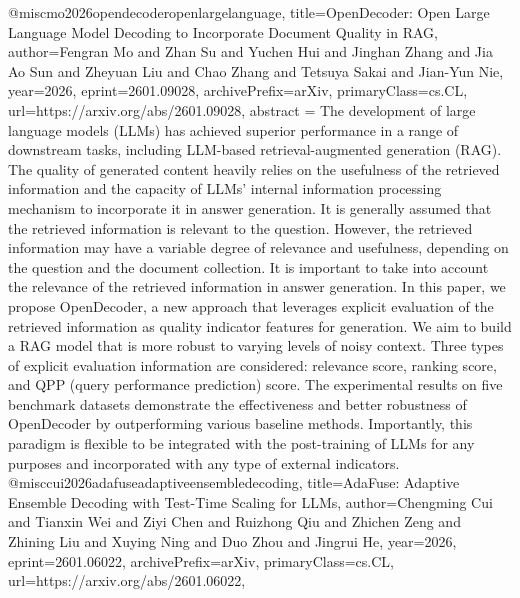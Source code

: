 {}@misc{mo2026opendecoderopenlargelanguage,
      title={OpenDecoder: Open Large Language Model Decoding to Incorporate Document Quality in RAG}, 
      author={Fengran Mo and Zhan Su and Yuchen Hui and Jinghan Zhang and Jia Ao Sun and Zheyuan Liu and Chao Zhang and Tetsuya Sakai and Jian-Yun Nie},
      year={2026},
      eprint={2601.09028},
      archivePrefix={arXiv},
      primaryClass={cs.CL},
      url={https://arxiv.org/abs/2601.09028},
      abstract = {The development of large language models (LLMs) has achieved superior performance in a range of downstream tasks, including LLM-based retrieval-augmented generation (RAG). The quality of generated content heavily relies on the usefulness of the retrieved information and the capacity of LLMs' internal information processing mechanism to incorporate it in answer generation. It is generally assumed that the retrieved information is relevant to the question. However, the retrieved information may have a variable degree of relevance and usefulness, depending on the question and the document collection. It is important to take into account the relevance of the retrieved information in answer generation. In this paper, we propose OpenDecoder, a new approach that leverages explicit evaluation of the retrieved information as quality indicator features for generation. We aim to build a RAG model that is more robust to varying levels of noisy context. Three types of explicit evaluation information are considered: relevance score, ranking score, and QPP (query performance prediction) score. The experimental results on five benchmark datasets demonstrate the effectiveness and better robustness of OpenDecoder by outperforming various baseline methods. Importantly, this paradigm is flexible to be integrated with the post-training of LLMs for any purposes and incorporated with any type of external indicators.}
}@misc{cui2026adafuseadaptiveensembledecoding,
      title={AdaFuse: Adaptive Ensemble Decoding with Test-Time Scaling for LLMs}, 
      author={Chengming Cui and Tianxin Wei and Ziyi Chen and Ruizhong Qiu and Zhichen Zeng and Zhining Liu and Xuying Ning and Duo Zhou and Jingrui He},
      year={2026},
      eprint={2601.06022},
      archivePrefix={arXiv},
      primaryClass={cs.CL},
      url={https://arxiv.org/abs/2601.06022},
}
